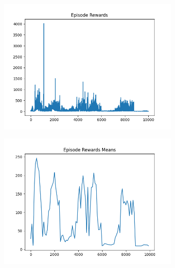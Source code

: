 \begin{figure}[H]
\begin{subfigure}{.47\linewidth}
        \includegraphics[width=\textwidth]{pole/2024-06-13_18-42-33_dqn_cartpole_episode_rewards.png}
    \end{subfigure}
    \begin{subfigure}{.47\linewidth}
        \centering
        \includegraphics[width=\textwidth]{pole/2024-06-13_18-42-33_dqn_cartpole_episode_rewards_means.png}
    \end{subfigure}
\end{figure}
